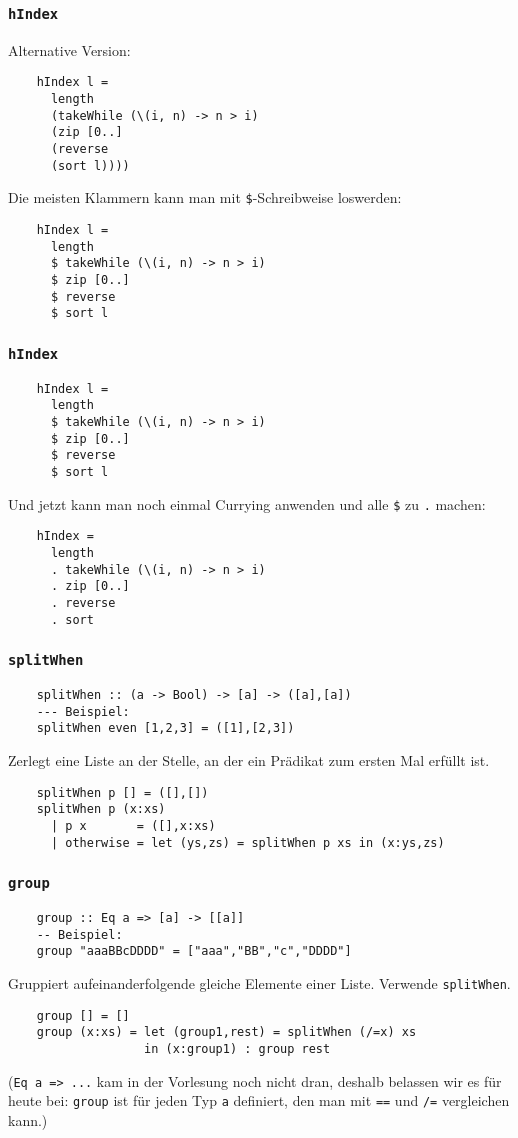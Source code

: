\documentclass{beamer}
\begin{document}
\begin{frame}[fragile]
  \frametitle{\lstinline{hIndex}}
  Alternative Version:
  \begin{lstlisting}
    hIndex l =
      length
      (takeWhile (\(i, n) -> n > i)
      (zip [0..]
      (reverse
      (sort l))))
  \end{lstlisting}
  \pause
  Die meisten Klammern kann man mit \lstinline{$}-Schreibweise loswerden:
  \begin{lstlisting}
    hIndex l =
      length
      $ takeWhile (\(i, n) -> n > i)
      $ zip [0..]
      $ reverse
      $ sort l
  \end{lstlisting}
\end{frame}

\begin{frame}[fragile]
  \frametitle{\lstinline{hIndex}}
  \begin{lstlisting}
    hIndex l =
      length
      $ takeWhile (\(i, n) -> n > i)
      $ zip [0..]
      $ reverse
      $ sort l
  \end{lstlisting}
  \pause
  Und jetzt kann man noch einmal Currying anwenden und alle \lstinline{$} zu \lstinline{.} machen:
  \begin{lstlisting}
    hIndex =
      length
      . takeWhile (\(i, n) -> n > i)
      . zip [0..]
      . reverse
      . sort
  \end{lstlisting}
\end{frame}

\begin{frame}[fragile]
  \frametitle{\lstinline{splitWhen}}
  \begin{lstlisting}
    splitWhen :: (a -> Bool) -> [a] -> ([a],[a])
    --- Beispiel:
    splitWhen even [1,2,3] = ([1],[2,3])
  \end{lstlisting}
  Zerlegt eine Liste an der Stelle, an der ein Prädikat zum ersten Mal erfüllt ist.
  \pause
  \begin{lstlisting}
    splitWhen p [] = ([],[])
    splitWhen p (x:xs)
      | p x       = ([],x:xs)
      | otherwise = let (ys,zs) = splitWhen p xs in (x:ys,zs)
  \end{lstlisting}
\end{frame}

\begin{frame}[fragile]
  \frametitle{\lstinline{group}}
  \begin{lstlisting}
    group :: Eq a => [a] -> [[a]]
    -- Beispiel:
    group "aaaBBcDDDD" = ["aaa","BB","c","DDDD"]
  \end{lstlisting}
  Gruppiert aufeinanderfolgende gleiche Elemente einer Liste.
  Verwende \lstinline{splitWhen}.
  \pause
  \begin{lstlisting}
    group [] = []
    group (x:xs) = let (group1,rest) = splitWhen (/=x) xs
                   in (x:group1) : group rest
  \end{lstlisting}
  (\lstinline{Eq a => ...} kam in der Vorlesung noch nicht dran,
  deshalb belassen wir es für heute bei:
  \lstinline{group} ist für jeden Typ \lstinline{a} definiert,
  den man mit \lstinline{==} und \lstinline{/=} vergleichen kann.)
\end{frame}
\end{document}
